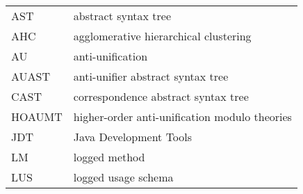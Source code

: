 \begin{tabular}{ll}
AST & abstract syntax tree\\
AHC & agglomerative hierarchical clustering\\
AU & anti-unification \\
AUAST & anti-unifier abstract syntax tree\\
CAST & correspondence abstract syntax tree\\
HOAUMT & higher-order anti-unification modulo theories\\
JDT & Java Development Tools\\
LM & logged method\\
LUS & logged usage schema\\
\end{tabular}
